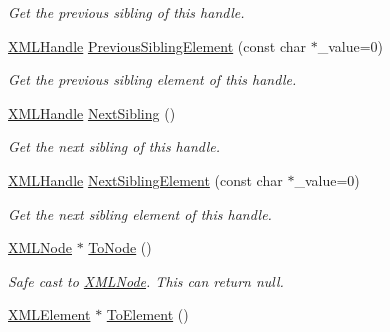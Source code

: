 \begin{DoxyCompactItemize}
\begin{DoxyCompactList}\small\item\em Get the previous sibling of this handle. \end{DoxyCompactList}\item 
\hypertarget{classtinyxml2_1_1_x_m_l_handle_a31a0d5d060292bec5df2b2efe2eca228}{}\hyperlink{classtinyxml2_1_1_x_m_l_handle}{X\+M\+L\+Handle} \hyperlink{classtinyxml2_1_1_x_m_l_handle_a31a0d5d060292bec5df2b2efe2eca228}{Previous\+Sibling\+Element} (const char $\ast$\+\_\+value=0)\label{classtinyxml2_1_1_x_m_l_handle_a31a0d5d060292bec5df2b2efe2eca228}

\begin{DoxyCompactList}\small\item\em Get the previous sibling element of this handle. \end{DoxyCompactList}\item 
\hypertarget{classtinyxml2_1_1_x_m_l_handle_aad2eccc7c7c7b18145877c978c3850b5}{}\hyperlink{classtinyxml2_1_1_x_m_l_handle}{X\+M\+L\+Handle} \hyperlink{classtinyxml2_1_1_x_m_l_handle_aad2eccc7c7c7b18145877c978c3850b5}{Next\+Sibling} ()\label{classtinyxml2_1_1_x_m_l_handle_aad2eccc7c7c7b18145877c978c3850b5}

\begin{DoxyCompactList}\small\item\em Get the next sibling of this handle. \end{DoxyCompactList}\item 
\hypertarget{classtinyxml2_1_1_x_m_l_handle_a447c9b284cfcd5518f9e320ba14b9c46}{}\hyperlink{classtinyxml2_1_1_x_m_l_handle}{X\+M\+L\+Handle} \hyperlink{classtinyxml2_1_1_x_m_l_handle_a447c9b284cfcd5518f9e320ba14b9c46}{Next\+Sibling\+Element} (const char $\ast$\+\_\+value=0)\label{classtinyxml2_1_1_x_m_l_handle_a447c9b284cfcd5518f9e320ba14b9c46}

\begin{DoxyCompactList}\small\item\em Get the next sibling element of this handle. \end{DoxyCompactList}\item 
\hypertarget{classtinyxml2_1_1_x_m_l_handle_a03ea6ec970a021b71bf1219a0f6717df}{}\hyperlink{classtinyxml2_1_1_x_m_l_node}{X\+M\+L\+Node} $\ast$ \hyperlink{classtinyxml2_1_1_x_m_l_handle_a03ea6ec970a021b71bf1219a0f6717df}{To\+Node} ()\label{classtinyxml2_1_1_x_m_l_handle_a03ea6ec970a021b71bf1219a0f6717df}

\begin{DoxyCompactList}\small\item\em Safe cast to \hyperlink{classtinyxml2_1_1_x_m_l_node}{X\+M\+L\+Node}. This can return null. \end{DoxyCompactList}\item 
\hypertarget{classtinyxml2_1_1_x_m_l_handle_a5e73ed8f3f6f9619d5a8bb1862c47d99}{}\hyperlink{classtinyxml2_1_1_x_m_l_element}{X\+M\+L\+Element} $\ast$ \hyperlink{classtinyxml2_1_1_x_m_l_handle_a5e73ed8f3f6f9619d5a8bb1862c47d99}{To\+Element} ()\label{classtinyxml2_1_1_x_m_l_handle_a5e73ed8f3f6f9619d5a8bb1862c47d99}


\end{DoxyCompactItemize}
